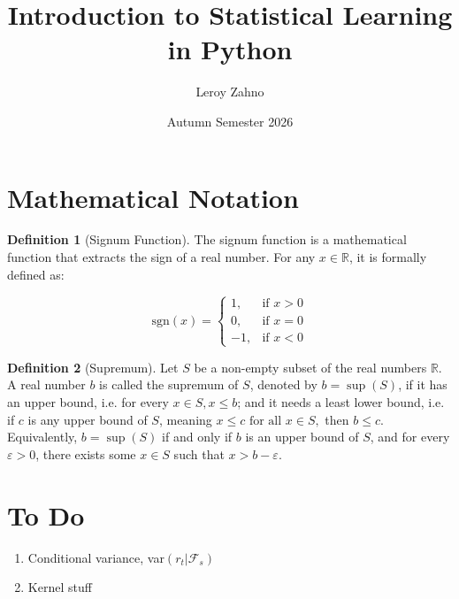 \documentclass{article}
\title{Introduction to Statistical Learning in Python}
\author{Leroy Zahno}
\date{Autumn Semester 2026}
\makeatletter
\renewcommand{\maketitle}{%
  \begin{center}
    {\LARGE \@title \par}
    \vspace{1em}
    {\large \@author \par}
    \vspace{1em}
    {\large \@date \par}
  \end{center}
}
\theoremstyle{definition}
\newtheorem{definition}{Definition}
\theoremstyle{Solution}
\makeatother
\begin{document}
\maketitle
\tableofcontents


\section{Mathematical Notation}

\begin{definition}[Signum Function] The signum function is a mathematical function that extracts the sign of a real number. For any $x \in \mathbb{R}$, it is formally defined as:

\begin{equation} 
\text{sgn}(x) = 
	\begin{cases} 	
		1, & \text{if } x > 0 \\ 
		0, & \text{if } x = 0 \\ 
		-1, & \text{if } x < 0 
	\end{cases} 
\end{equation}

\end{definition}

\begin{definition}[Supremum]
Let \(S\) be a non-empty subset of the real numbers \(\mathbb{R}\). A real number \(b\) is called the supremum of \(S\), denoted by \(b = \sup(S)\), if it has an upper bound, i.e. for every \(x \in S, x \leq b \); and it needs a least lower bound, i.e. if \(c\) is any upper bound of \(S\), meaning \(x \leq c \text{ for all } x \in S,\) then \(b \leq c.\) Equivalently, \(b = \sup(S)\) if and only if \(b\) is an upper bound of \(S\), and for every \(\varepsilon > 0\), there exists some \(x \in S\) such that \(x > b - \varepsilon.\)
\end{definition}


\section{To Do}

\begin{enumerate}
	\item Conditional variance, var\((r_t|\mathcal{F}_s)\)
	\item Kernel stuff
\end{enumerate}
\end{document}
